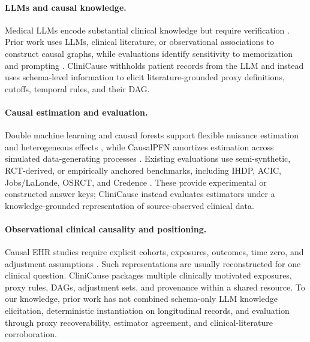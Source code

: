 \documentclass[letterpaper]{article}
\begin{document}
\paragraph{LLMs and causal knowledge.}
Medical LLMs encode substantial clinical knowledge but require verification
\cite{singhal_et_al_2023_llm_clinical_knowledge}. Prior work uses LLMs, clinical
literature, or observational associations to construct causal graphs, while
evaluations identify sensitivity to memorization and prompting
\cite{roy2025causalllm,feng2025reliability,
nordon2019medicalcausalgraphs}. CliniCause withholds patient records from the
LLM and instead uses schema-level information to elicit literature-grounded
proxy definitions, cutoffs, temporal rules, and their DAG.

\paragraph{Causal estimation and evaluation.}
Double machine learning and causal forests support flexible nuisance estimation
and heterogeneous effects
\cite{chernozhukov2018dml,wager2018causalforest,athey2019grf}, while
CausalPFN amortizes estimation across simulated data-generating processes
\cite{balazadeh2025causalpfn}. Existing evaluations use semi-synthetic,
RCT-derived, or empirically anchored benchmarks, including IHDP, ACIC,
Jobs/LaLonde, OSRCT, and Credence
\cite{alaa2019validating,gentzel2021experimental,
parikh2022validating}. These provide experimental or constructed answer keys;
CliniCause instead evaluates estimators under a knowledge-grounded
representation of source-observed clinical data.

\paragraph{Observational clinical causality and positioning.}
Causal EHR studies require explicit cohorts, exposures, outcomes, time zero,
and adjustment assumptions
\cite{hernan_robins_2016_target_trial,
hernan_taubman_2008_well_defined_interventions,bica_2021_individualized_treatment_effects_ehr_ml}.
Such representations are usually reconstructed for one clinical question.
CliniCause packages multiple clinically motivated exposures, proxy rules, DAGs,
adjustment sets, and provenance within a shared resource. To our knowledge,
prior work has not combined schema-only LLM knowledge elicitation,
deterministic instantiation on longitudinal records, and evaluation through
proxy recoverability, estimator agreement, and clinical-literature
corroboration.
\end{document}

